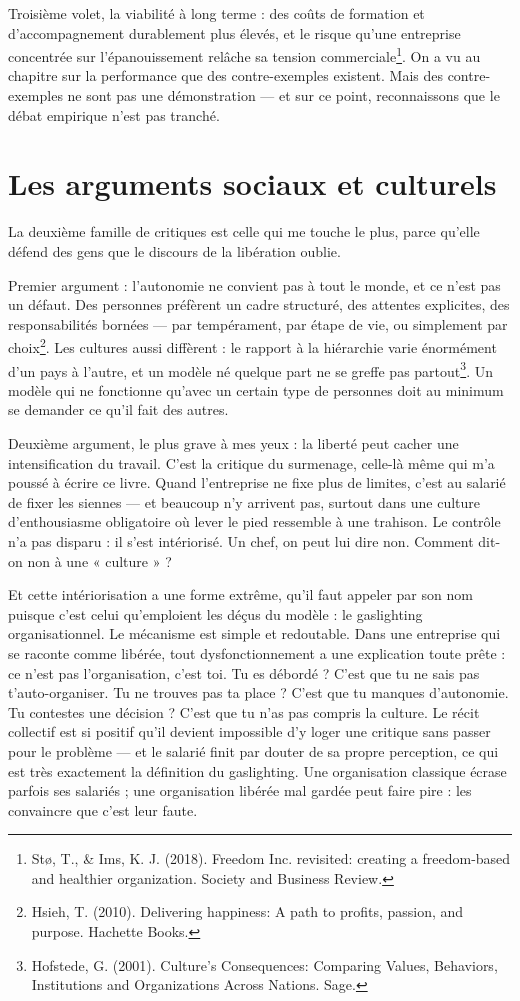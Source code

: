 Troisième volet, la viabilité à long terme : des coûts de formation et d'accompagnement durablement plus élevés, et le risque qu'une entreprise concentrée sur l'épanouissement relâche sa tension commerciale\footnote{Stø, T., \& Ims, K. J. (2018). Freedom Inc. revisited: creating a freedom-based and healthier organization. Society and Business Review.}. On a vu au chapitre sur la performance que des contre-exemples existent. Mais des contre-exemples ne sont pas une démonstration — et sur ce point, reconnaissons que le débat empirique n'est pas tranché.

\section{Les arguments sociaux et culturels}

La deuxième famille de critiques est celle qui me touche le plus, parce qu'elle défend des gens que le discours de la libération oublie.

Premier argument : l'autonomie ne convient pas à tout le monde, et ce n'est pas un défaut. Des personnes préfèrent un cadre structuré, des attentes explicites, des responsabilités bornées — par tempérament, par étape de vie, ou simplement par choix\footnote{Hsieh, T. (2010). Delivering happiness: A path to profits, passion, and purpose. Hachette Books.}. Les cultures aussi diffèrent : le rapport à la hiérarchie varie énormément d'un pays à l'autre, et un modèle né quelque part ne se greffe pas partout\footnote{Hofstede, G. (2001). Culture's Consequences: Comparing Values, Behaviors, Institutions and Organizations Across Nations. Sage.}. Un modèle qui ne fonctionne qu'avec un certain type de personnes doit au minimum se demander ce qu'il fait des autres.

Deuxième argument, le plus grave à mes yeux : la liberté peut cacher une intensification du travail. C'est la critique du surmenage, celle-là même qui m'a poussé à écrire ce livre. Quand l'entreprise ne fixe plus de limites, c'est au salarié de fixer les siennes — et beaucoup n'y arrivent pas, surtout dans une culture d'enthousiasme obligatoire où lever le pied ressemble à une trahison. Le contrôle n'a pas disparu : il s'est intériorisé. Un chef, on peut lui dire non. Comment dit-on non à une « culture » ?

Et cette intériorisation a une forme extrême, qu'il faut appeler par son nom puisque c'est celui qu'emploient les déçus du modèle : le gaslighting organisationnel. Le mécanisme est simple et redoutable. Dans une entreprise qui se raconte comme libérée, tout dysfonctionnement a une explication toute prête : ce n'est pas l'organisation, c'est toi. Tu es débordé ? C'est que tu ne sais pas t'auto-organiser. Tu ne trouves pas ta place ? C'est que tu manques d'autonomie. Tu contestes une décision ? C'est que tu n'as pas compris la culture. Le récit collectif est si positif qu'il devient impossible d'y loger une critique sans passer pour le problème — et le salarié finit par douter de sa propre perception, ce qui est très exactement la définition du gaslighting. Une organisation classique écrase parfois ses salariés ; une organisation libérée mal gardée peut faire pire : les convaincre que c'est leur faute.

